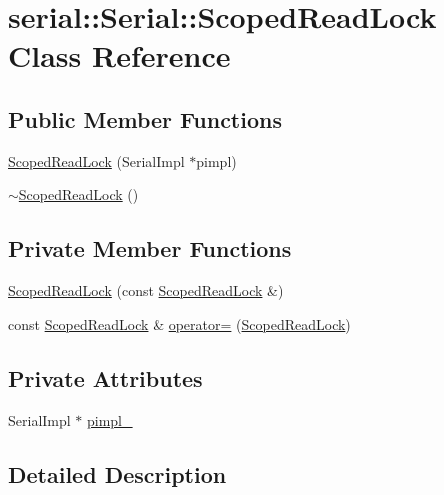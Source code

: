\hypertarget{class_serial_1_1_scoped_read_lock}{}\section{serial\+:\+:Serial\+:\+:Scoped\+Read\+Lock Class Reference}
\label{class_serial_1_1_scoped_read_lock}
\subsection*{Public Member Functions}
\begin{DoxyCompactItemize}
\item 
\hyperlink{class_serial_1_1_scoped_read_lock_a54f59663807d8adfe6db712ee6103503}{Scoped\+Read\+Lock} (Serial\+Impl $\ast$pimpl)
\item 
\hyperlink{class_serial_1_1_scoped_read_lock_a5c061909b95231cec776c40094c878b4}{$\sim$\+Scoped\+Read\+Lock} ()
\end{DoxyCompactItemize}
\subsection*{Private Member Functions}
\begin{DoxyCompactItemize}
\item 
\hyperlink{class_serial_1_1_scoped_read_lock_aaa07c58100c341ddef3346363a62ace2}{Scoped\+Read\+Lock} (const \hyperlink{class_serial_1_1_scoped_read_lock}{Scoped\+Read\+Lock} \&)
\item 
const \hyperlink{class_serial_1_1_scoped_read_lock}{Scoped\+Read\+Lock} \& \hyperlink{class_serial_1_1_scoped_read_lock_a7588a583d445b0c06f79cf7bbf503883}{operator=} (\hyperlink{class_serial_1_1_scoped_read_lock}{Scoped\+Read\+Lock})
\end{DoxyCompactItemize}
\subsection*{Private Attributes}
\begin{DoxyCompactItemize}
\item 
Serial\+Impl $\ast$ \hyperlink{class_serial_1_1_scoped_read_lock_ae2220f73a557b57a5349d75282b4bcc6}{pimpl\+\_\+}
\end{DoxyCompactItemize}


\subsection{Detailed Description}


